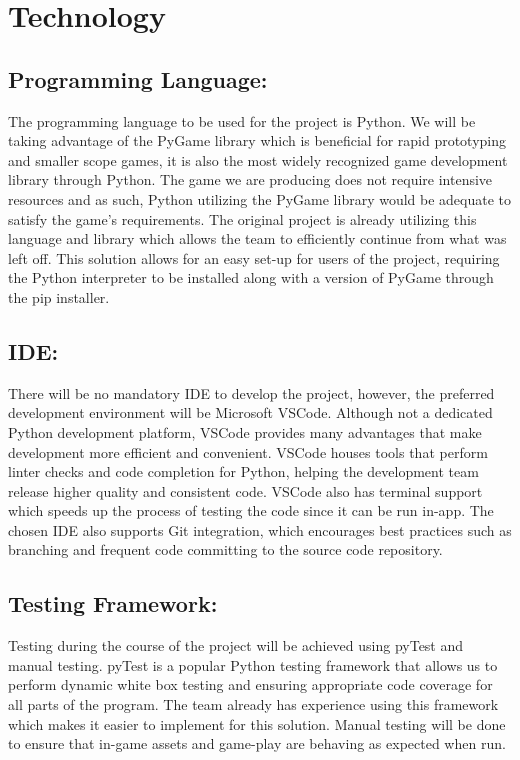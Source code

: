 \documentclass{article}
\begin{document}
\section{Technology}

\subsection*{Programming Language:}

The programming language to be used for the project is Python. We will be taking
advantage of the PyGame library which is beneficial for rapid prototyping and
smaller scope games, it is also the most widely recognized game development
library through Python. The game we are producing does not require intensive
resources and as such, Python utilizing the PyGame library would be adequate to
satisfy the game’s requirements. The original project is already utilizing this
language and library which allows the team to efficiently continue from what was
left off. This solution allows for an easy set-up for users of the project,
requiring the Python interpreter to be installed along with a version of PyGame
through the pip installer.

\subsection*{IDE:}

There will be no mandatory IDE to develop the project, however, the preferred
development environment will be Microsoft VSCode. Although not a dedicated
Python development platform, VSCode provides many advantages that make
development more efficient and convenient. VSCode houses tools that perform
linter checks and code completion for Python, helping the development team
release higher quality and consistent code. VSCode also has terminal support
which speeds up the process of testing the code since it can be run in-app. The
chosen IDE also supports Git integration, which encourages best practices such
as branching and frequent code committing to the source code repository.

\subsection*{Testing Framework:}

Testing during the course of the project will be achieved using pyTest and
manual testing. pyTest is a popular Python testing framework that allows us to
perform dynamic white box testing and ensuring appropriate code coverage for all
parts of the program. The team already has experience using this framework which
makes it easier to implement for this solution. Manual testing will be done to
ensure that in-game assets and game-play are behaving as expected when run.
\end{document}
